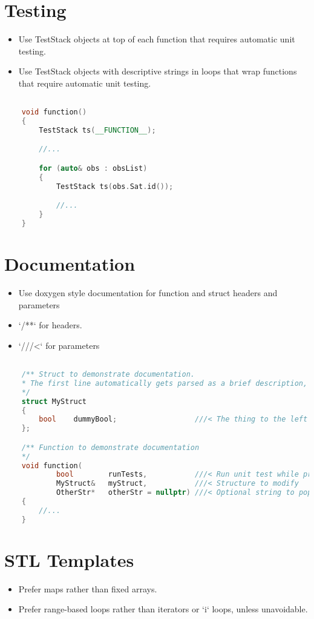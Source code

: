\section{Testing}
\begin{itemize}
	\item Use TestStack objects at top of each function that requires automatic unit testing.
	\item Use TestStack objects with descriptive strings in loops that wrap functions that require automatic unit testing.
\end{itemize}
\begin{lstlisting}[language=c++]

    void function()
    {
        TestStack ts(__FUNCTION__);

        //...

        for (auto& obs : obsList)
        {
            TestStack ts(obs.Sat.id());

            //...
        }
    }
\end{lstlisting}
\section{Documentation}
\begin{itemize}
\item Use doxygen style documentation for function and struct headers and parameters
\item `/**`  for headers.
\item `///<` for parameters
\end{itemize}
\begin{lstlisting}[language=c++]

    /** Struct to demonstrate documentation.
    * The first line automatically gets parsed as a brief description, but more detailed descriptions are possible too.
    */
    struct MyStruct
    {
        bool    dummyBool;                  ///< The thing to the left is documented here
    };

    /** Function to demonstrate documentation
    */
    void function(
            bool        runTests,           ///< Run unit test while processing
            MyStruct&   myStruct,           ///< Structure to modify
            OtherStr*	otherStr = nullptr)	///< Optional string to populate
    {
    	//...
    }
\end{lstlisting}

\section{STL Templates}
\begin{itemize}
\item Prefer maps rather than fixed arrays.
\item Prefer range-based loops rather than iterators or `i` loops, unless unavoidable.
\end{itemize}

